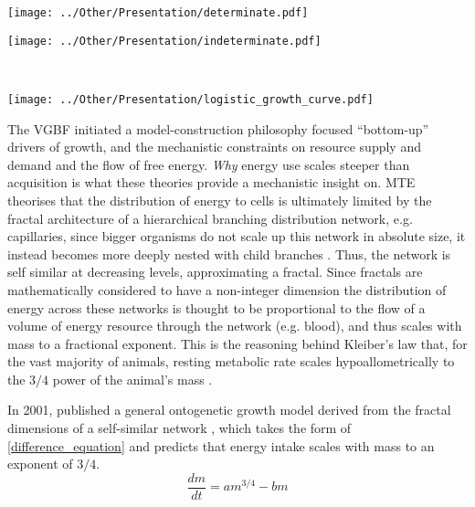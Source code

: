 \documentclass[a4paper]{article} %
\begin{document}
        \begin{center}
            \begin{minipage}{0.33\linewidth}
            \texttt{[image: ../Other/Presentation/determinate.pdf]}
            \label{determinate}
            \end{minipage}%
            \begin{minipage}{0.33\linewidth}
            \texttt{[image: ../Other/Presentation/indeterminate.pdf]}  
            \label{indeterminate}
            \end{minipage}\\
            \begin{minipage}{0.7\linewidth}
                \texttt{[image: ../Other/Presentation/logistic\_growth\_curve.pdf]}  
                \label{logistic_growth}
                \end{minipage}
        \end{center}
        The VGBF initiated a model-construction philosophy focused ``bottom-up'' drivers of growth, and the mechanistic constraints on resource supply and demand and the flow of free energy.
        \textit{Why} energy use scales steeper than acquisition is what these theories provide a mechanistic insight on. MTE theorises that the distribution of energy to cells is ultimately limited by the fractal architecture of a hierarchical branching distribution network, e.g. capillaries, since bigger organisms do not scale up this network in absolute size, it instead becomes more deeply nested with child branches \autocite{West1997}. Thus, the network is self similar at decreasing levels, approximating a fractal. Since fractals are mathematically considered to have a non-integer dimension \autocite{Hausdorff1918, Mandelbrot1982} the distribution of energy across these networks is thought to be proportional to the flow of a volume of energy resource through the network (e.g. blood), and thus scales with mass to a fractional exponent.  This is the reasoning behind Kleiber's law that, for the vast majority of animals, resting metabolic rate scales hypoallometrically to the $3/4$ power of the animal's mass \autocite{Kleiber1947}. 
        
        In 2001, \cite{West2001} published a general ontogenetic growth model derived from the fractal dimensions of a self-similar network \autocite{West1997}, which takes the form of \eqref{difference_equation} and predicts that energy intake scales with mass to an exponent of $3/4$.  
        \begin{equation}
            \frac{dm}{dt} = am^{3/4} - bm \label{west_ogm}
        \end{equation}
\end{document}
